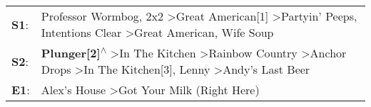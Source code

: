 \begin{supertabular}{p{0.03\textwidth}p{0.92\textwidth}}
 \textbf{S1}:  &                                          Professor Wormbog\textsuperscript{}, \enspace 2x2\textsuperscript{} \textgreater \enspace Great American[1]\textsuperscript{} \textgreater \enspace Partyin' Peeps\textsuperscript{}, \enspace Intentions Clear\textsuperscript{} \textgreater \enspace Great American\textsuperscript{}, \enspace Wife Soup\textsuperscript{}  \enspace  \\
 \textbf{S2}:  &  \textbf{Plunger[2]\textsuperscript{$\wedge$}} \textgreater \enspace In The Kitchen\textsuperscript{} \textgreater \enspace Rainbow Country\textsuperscript{} \textgreater \enspace Anchor Drops\textsuperscript{} \textgreater \enspace In The Kitchen[3]\textsuperscript{}, \enspace Lenny\textsuperscript{} \textgreater \enspace Andy's Last Beer\textsuperscript{}  \enspace  \\
 \textbf{E1}:  &                                                                                                                                                                                                                                                                       Alex's House\textsuperscript{} \textgreater \enspace Got Your Milk (Right Here)\textsuperscript{}  \enspace  \\
\end{supertabular}
